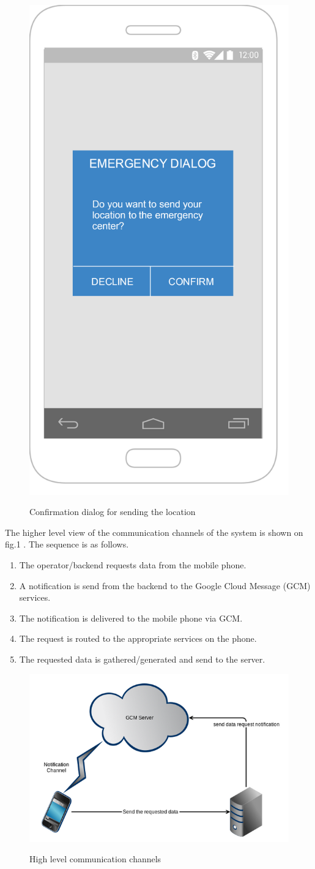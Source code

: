 \documentclass{article}
\begin{document}
	
	\begin{figure}[H]
		\centering
		\includegraphics[width=.4\textwidth]{"AutomaticVideoSending/send_location_confirmation"}
		
		Confirmation dialog for sending the location
		\vspace{-20pt}
	\end{figure}


The higher level view of the communication channels of the system is shown on fig.1 . The sequence is as follows.
\begin{enumerate}
\item The operator/backend requests data from the mobile phone.
\item A notification is send from the backend to the Google Cloud Message (GCM) services.
\item The notification is delivered to the mobile phone via GCM.
\item The request is routed to the appropriate services on the phone.
\item The requested data is gathered/generated and send to the server.
\end{enumerate}

	\begin{figure}[H]
		\centering
		\includegraphics[width=1\textwidth]{"AutomaticVideoSending/gcm"}
		
		High level communication channels
	\end{figure}
	
\end{document}
